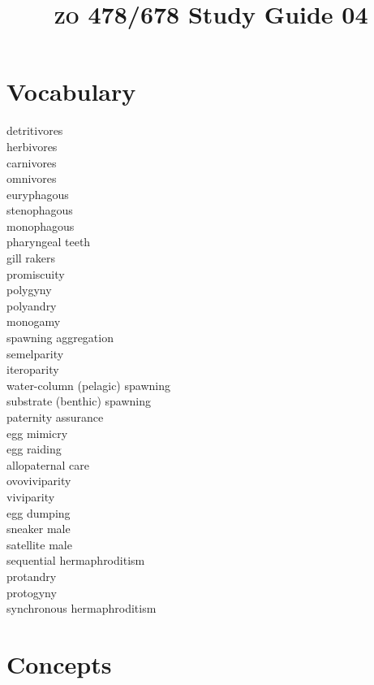 \documentclass[letterpaper]{tufte-handout}
\title{{\scshape zo} 478/678 Study Guide 04}
\date{} %
\begin{document}
\maketitle	%


\section{Vocabulary} 
\vspace{-1\baselineskip}
\begin{multicols}{2}
detritivores \\
herbivores \\
carnivores \\
omnivores \\
euryphagous \\
stenophagous \\
monophagous \\
pharyngeal teeth \\
gill rakers \\
promiscuity \\
polygyny \\
polyandry \\
monogamy \\
spawning aggregation \\
semelparity \\
iteroparity \\
water-column (pelagic) spawning \\
substrate (benthic) spawning \\
paternity assurance \\
egg mimicry \\
egg raiding \\
allopaternal care \\
ovoviviparity \\
viviparity \\
egg dumping \\
sneaker male \\
satellite male \\
sequential hermaphroditism \\
protandry \\
protogyny \\
synchronous hermaphroditism 
\end{multicols}

\section{Concepts}
\end{document}
